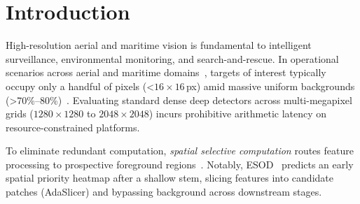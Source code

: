 \section{Introduction}
\label{sec:intro}

High-resolution aerial and maritime vision is fundamental to intelligent surveillance, environmental monitoring, and search-and-rescue. In operational scenarios across aerial and maritime domains~\cite{VisDrone,UAVDT,TinyPerson}, targets of interest typically occupy only a handful of pixels (\textless$16\times16$\,px) amid massive uniform backgrounds (\textgreater70\%--80\%)~\cite{AutoFocus}. Evaluating standard dense deep detectors across multi-megapixel grids ($1280\times 1280$ to $2048\times 2048$) incurs prohibitive arithmetic latency on resource-constrained platforms.

To eliminate redundant computation, \emph{spatial selective computation} routes feature processing to prospective foreground regions~\cite{QueryDet,CEASC}. Notably, ESOD~\cite{ESOD} predicts an early spatial priority heatmap after a shallow stem, slicing features into candidate patches (AdaSlicer) and bypassing background across downstream stages.

